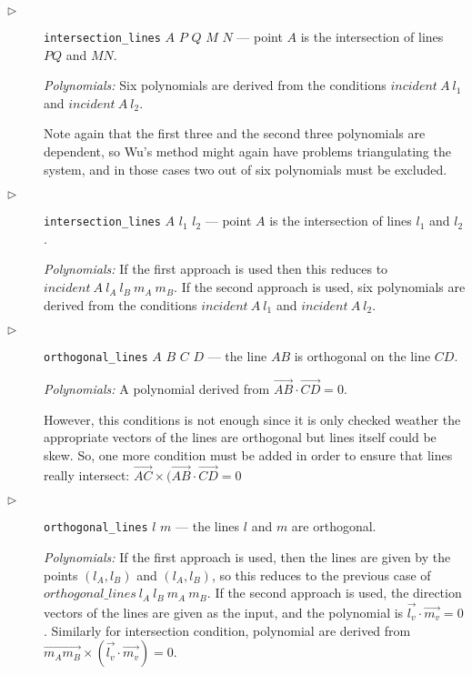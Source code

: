 \documentclass[final,1p,times,authoryear]{elsarticle}
\begin{document}
\begin{description}
\item[$\triangleright$] {\tt intersection\_lines} $A$ $P$ $Q$ $M$ $N$
  --- point $A$ is the intersection of lines $PQ$ and $MN$.

  {\em Polynomials:} Six polynomials are derived from the conditions
$incident\ A\ l_1$ and $incident\ A\ l_2$.

Note again that the first three and the second three polynomials are
dependent, so Wu's method might again have problems triangulating the
system, and in those cases two out of six polynomials must be
excluded.

\item[$\triangleright$] {\tt intersection\_lines} $A$ $l_1$ $l_2$ ---
  point $A$ is the intersection of lines $l_1$ and $l_2$.

  {\em Polynomials:} If the first approach is used then this reduces
  to $incident\ A\ l_A\ l_B\ m_A\ m_B$. If the second approach is
  used, six polynomials are derived from the conditions
  $incident\ A\ l_1$ and $incident\ A\ l_2$.


\item[$\triangleright$] {\tt orthogonal\_lines} $A$ $B$ $C$ $D$ ---
  the line $AB$ is orthogonal on the line $CD$.

{\em Polynomials:} A polynomial derived from $\overrightarrow{AB}
\cdot \overrightarrow{CD} = 0$.

However, this conditions is not enough since it is only checked
weather the appropriate vectors of the lines are orthogonal but lines
itself could be skew. So, one more condition must be added in order to
ensure that lines really intersect: $\overrightarrow{AC} \times
(\overrightarrow{AB} \cdot \overrightarrow{CD} = 0$

\item[$\triangleright$] {\tt orthogonal\_lines} $l$ $m$ --- the lines
  $l$ and $m$ are orthogonal.

{\em Polynomials:} If the first approach is used, then the lines are
given by the points $(l_A, l_B)$ and $(l_A, l_B)$, so this reduces to
the previous case of $orthogonal\_lines\ l_A\ l_B\ m_A\ m_B$. If the
second approach is used, the direction vectors of the lines are given
as the input, and the polynomial is $\overrightarrow{l_v} \cdot
\overrightarrow{m_v} = 0$. Similarly for intersection condition,
polynomial are derived from $\overrightarrow{m_Am_B} \times
(\overrightarrow{l_v} \cdot \overrightarrow{m_v}) = 0$.


\end{description}
\end{document}
